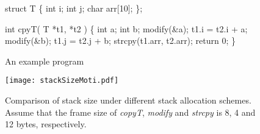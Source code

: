 \begin{figure*}[htbp!]
\centering
\begin{minipage}{0.3\linewidth}
\centering
\begin{spacing}{0.5}
\begin{program}  
struct T
\{
	int i;
	int j;
	char arr[10];
\};

int cpyT( T *t1, *t2 )
\{
	int a;
	int b;		
	modify(\&a);	
	t1.i = t2.i + a;
	modify(\&b);
	t1.j = t2.j + b;	
	strcpy(t1.arr, t2.arr);		
	return 0;
\}
\end{program}
\end{spacing}
\vspace{-.2in}
\caption{An example program} %
\label{fig:sampleCode}
\end{minipage}
\begin{minipage}{0.6\linewidth}
\centering
\vspace{.35in}
\texttt{[image: stackSizeMoti.pdf]}
\caption{Comparison of stack size under different stack allocation schemes. Assume that the frame size of \textit{copyT}, \textit{modify} and \textit{strcpy} is 8, 4 and 12 bytes, respectively.}
\label{fig:stackSizeMoti}
\end{minipage}
\end{figure*}




